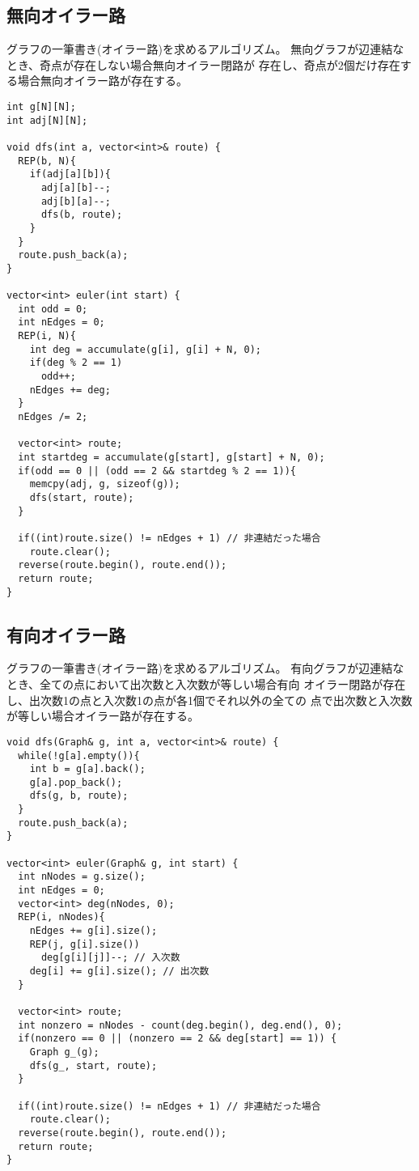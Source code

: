\subsection{無向オイラー路}

グラフの一筆書き(オイラー路)を求めるアルゴリズム。
無向グラフが辺連結なとき、奇点が存在しない場合無向オイラー閉路が
存在し、奇点が2個だけ存在する場合無向オイラー路が存在する。


\begin{lstlisting}
int g[N][N];
int adj[N][N];
 
void dfs(int a, vector<int>& route) {
  REP(b, N){
    if(adj[a][b]){
      adj[a][b]--;
      adj[b][a]--;
      dfs(b, route);
    }
  }
  route.push_back(a);
}
 
vector<int> euler(int start) {
  int odd = 0;
  int nEdges = 0;
  REP(i, N){
    int deg = accumulate(g[i], g[i] + N, 0);
    if(deg % 2 == 1)
      odd++;
    nEdges += deg;
  }
  nEdges /= 2;
 
  vector<int> route;
  int startdeg = accumulate(g[start], g[start] + N, 0);
  if(odd == 0 || (odd == 2 && startdeg % 2 == 1)){
    memcpy(adj, g, sizeof(g));
    dfs(start, route);
  }
  
  if((int)route.size() != nEdges + 1) // 非連結だった場合
    route.clear();
  reverse(route.begin(), route.end());
  return route;
}
\end{lstlisting}



\subsection{有向オイラー路}

グラフの一筆書き(オイラー路)を求めるアルゴリズム。
有向グラフが辺連結なとき、全ての点において出次数と入次数が等しい場合有向
オイラー閉路が存在し、出次数1の点と入次数1の点が各1個でそれ以外の全ての
点で出次数と入次数が等しい場合オイラー路が存在する。

\begin{lstlisting}
void dfs(Graph& g, int a, vector<int>& route) {
  while(!g[a].empty()){
    int b = g[a].back();
    g[a].pop_back();
    dfs(g, b, route);
  }
  route.push_back(a);
}
 
vector<int> euler(Graph& g, int start) {
  int nNodes = g.size();
  int nEdges = 0;
  vector<int> deg(nNodes, 0);
  REP(i, nNodes){
    nEdges += g[i].size();
    REP(j, g[i].size())
      deg[g[i][j]]--; // 入次数
    deg[i] += g[i].size(); // 出次数
  }
  
  vector<int> route;
  int nonzero = nNodes - count(deg.begin(), deg.end(), 0);
  if(nonzero == 0 || (nonzero == 2 && deg[start] == 1)) {
    Graph g_(g);
    dfs(g_, start, route);
  }
    
  if((int)route.size() != nEdges + 1) // 非連結だった場合
    route.clear();
  reverse(route.begin(), route.end());
  return route;
}
\end{lstlisting}

